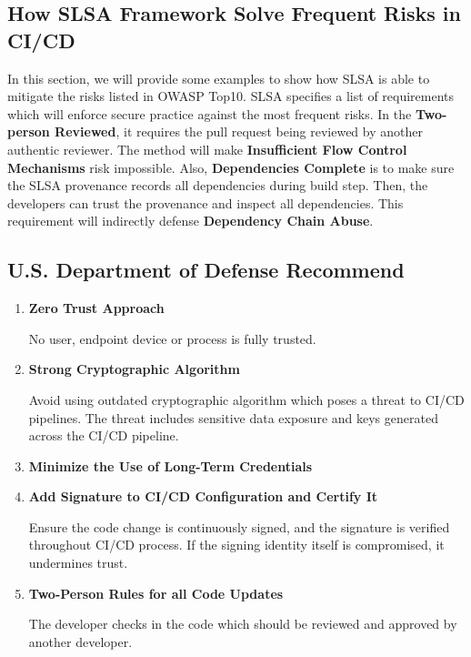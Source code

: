 \subsection{How SLSA Framework Solve Frequent Risks in CI/CD}
In this section, we will provide some examples to show how SLSA is able to mitigate the risks listed in OWASP Top10.
SLSA specifies a list of requirements which will enforce secure practice against the most frequent risks.
In the \textbf{Two-person Reviewed}, it requires the pull request being reviewed by another authentic reviewer.
The method will make \textbf{Insufficient Flow Control Mechanisms} risk impossible.
Also, \textbf{Dependencies Complete} is to make sure the SLSA provenance records all dependencies during
build step. Then, the developers can trust the provenance and inspect all dependencies. This requirement 
will indirectly defense \textbf{Dependency Chain Abuse}.



\subsection{ U.S. Department of Defense Recommend \cite{DoDDefCI/CD2023}}
\begin{enumerate}
    \item \textbf{Zero Trust Approach}
    
        No user, endpoint device or process is fully trusted.

    \item \textbf{Strong Cryptographic Algorithm}
    
        Avoid using outdated cryptographic algorithm which poses a threat to CI/CD pipelines.
        The threat includes sensitive data exposure and keys generated across the CI/CD 
        pipeline.

    \item \textbf{Minimize the Use of Long-Term Credentials}

    \item \textbf{Add Signature to CI/CD Configuration and Certify It}

        Ensure the code change is continuously signed, and the signature is verified throughout
        CI/CD process. If the signing identity itself is compromised, it undermines trust.
    
    \item \textbf{Two-Person Rules for all Code Updates}

        The developer checks in the code which should be reviewed and approved by another 
        developer. 

\end{enumerate}

